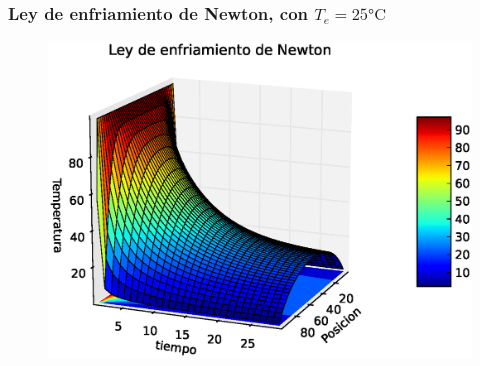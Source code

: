 \documentclass[12pt]{beamer}
\begin{document}
\begin{frame}
\frametitle{Ley de enfriamiento de Newton, con $T_{e}=25 \si\celsius$}
\begin{figure}
	\centering
	\includegraphics[scale=0.5]{Imagenes/EqCalor09.eps}  
\end{figure}
\end{frame}
\end{document}
